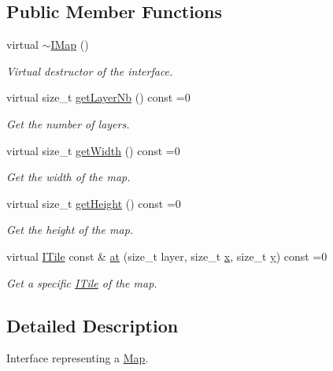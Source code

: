 \subsection*{Public Member Functions}
\begin{DoxyCompactItemize}
\item 
virtual \hyperlink{classarcade_1_1_i_map_aaa3aa1b624552b9ab830067ab42f78dd}{$\sim$\+I\+Map} ()
\begin{DoxyCompactList}\small\item\em Virtual destructor of the interface. \end{DoxyCompactList}\item 
virtual size\+\_\+t \hyperlink{classarcade_1_1_i_map_a3e5fc4c5286f92fb49c8c7d0e79f4510}{get\+Layer\+Nb} () const =0
\begin{DoxyCompactList}\small\item\em Get the number of layers. \end{DoxyCompactList}\item 
virtual size\+\_\+t \hyperlink{classarcade_1_1_i_map_a6e7534eeff05277f1429037f8b01e25f}{get\+Width} () const =0
\begin{DoxyCompactList}\small\item\em Get the width of the map. \end{DoxyCompactList}\item 
virtual size\+\_\+t \hyperlink{classarcade_1_1_i_map_a9282ac731fa61b8c18241a309efbd6a0}{get\+Height} () const =0
\begin{DoxyCompactList}\small\item\em Get the height of the map. \end{DoxyCompactList}\item 
virtual \hyperlink{classarcade_1_1_i_tile}{I\+Tile} const  \& \hyperlink{classarcade_1_1_i_map_a8206c36a51d8394145fd3b7b29e42f8d}{at} (size\+\_\+t layer, size\+\_\+t \hyperlink{include_2_protocol_8hpp_a4dde988b1b2adba65ae3efa69f65d960}{x}, size\+\_\+t \hyperlink{include_2_protocol_8hpp_ab0580f504a7428539be299fa71565f30}{y}) const =0
\begin{DoxyCompactList}\small\item\em Get a specific \hyperlink{classarcade_1_1_i_tile}{I\+Tile} of the map. \end{DoxyCompactList}\end{DoxyCompactItemize}


\subsection{Detailed Description}
Interface representing a \hyperlink{classarcade_1_1_map}{Map}. 

